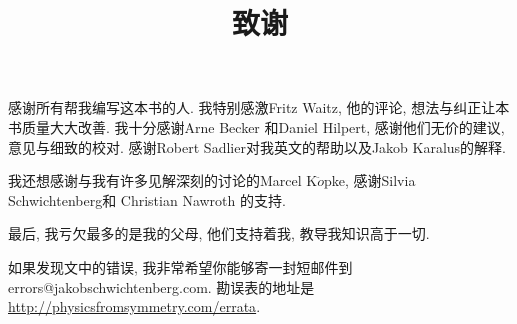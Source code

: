 \documentclass[hyperref, UTF8]{ctexart}
\title{致谢}
\begin{document}
	
\maketitle

感谢所有帮我编写这本书的人. 我特别感激Fritz Waitz, 他的评论, 想法与纠正让本书质量大大改善. 我十分感谢Arne Becker 和Daniel Hilpert, 感谢他们无价的建议,意见与细致的校对. 感谢Robert Sadlier对我英文的帮助以及Jakob Karalus的解释.

我还想感谢与我有许多见解深刻的讨论的Marcel K$\ddot{o}$pke, 感谢Silvia Schwichtenberg和 Christian Nawroth 的支持.

最后, 我亏欠最多的是我的父母, 他们支持着我, 教导我知识高于一切.

如果发现文中的错误, 我非常希望你能够寄一封短邮件到 errors@jakobschwichtenberg.com. 勘误表的地址是\url{http://physicsfromsymmetry.com/errata}.
\end{document}
